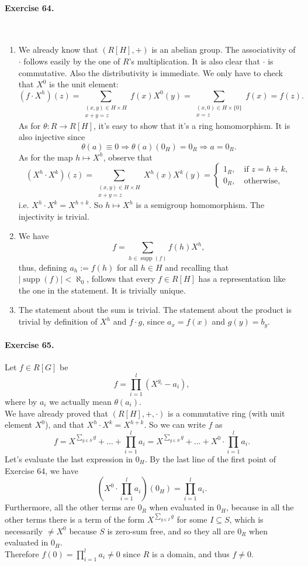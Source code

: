 \documentclass[12pt,a4paper]{report}
\theoremstyle{definition}
\theoremstyle{num.custom-title}
\DeclareMathOperator{\imp}{\Rightarrow}
\DeclareMathOperator{\sse}{\subseteq}
\DeclareMathOperator{\supp}{supp}
\begin{document}
\paragraph{Exercise 64.} \ 
\begin{enumerate}
\item We already know that $(R[H],+)$ is an abelian group. The associativity of $\cdot$ follows easily by the one of $R$'s multiplication. It is also clear that $\cdot$ is commutative. Also the distributivity is immediate. We only have to check that $X^0$ is the unit element:
\[
(f \cdot X^h)(z) = \sum_{\substack{(x,y) \in H \times H \\ x+y=z}} f(x) X^0(y) = \sum_{\substack{(x,0) \in H \times \{0\} \\ x=z}} f(x) = f(z).
\]
As for $\theta : R \to R[H]$, it's easy to show that it's a ring homomorphism. It is also injective since
\[
\theta(a) \equiv 0 \imp \theta(a)(0_H) = 0_R \imp a = 0_R.
\]
As for the map $h \mapsto X^h$, observe that
\[
(X^h \cdot X^k)(z) = \sum_{\substack{(x,y) \in H \times H \\ x+y=z}} X^h(x) X^k(y) =
\begin{cases}
1_R, \quad \text{if } z=h+k, \\
0_R, \quad \text{otherwise,}
\end{cases}
\]
i.e. $X^h \cdot X^k = X^{h+k}$. So $h \mapsto X^h$ is a semigroup homomorphism. The injectivity is trivial.
\item We have
\[
f = \sum_{h \in \supp(f)} f(h) X^h,
\]
thus, defining $a_h := f(h)$ for all $h \in H$ and recalling that $|\supp(f)| < \aleph_0$, follows that every $f \in R[H]$ has a representation like the one in the statement. It is trivially unique.
\item The statement about the sum is trivial. The statement about the product is trivial by definition of $X^h$ and $f \cdot g$, since $a_x = f(x)$ and $g(y) = b_y$.
\end{enumerate}

\paragraph{Exercise 65.} Let $f \in R[G]$ be
\[
f = \prod_{i=1}^l (X^{g_i} - a_i),
\]
where by $a_i$ we actually mean $\theta(a_i)$.\\
 We have already proved that $(R[H],+,\cdot)$ is a commutative ring (with unit element $X^0$), and that $X^h \cdot X^k = X^{h+k}$. So we can write $f$ as
\[
f= X^{\sum_{g \in S} g} + \ldots + \prod_{i=1}^l a_i = X^{\sum_{g \in S} g} + \ldots + X^0 \cdot \prod_{i=1}^l a_i.
\]
Let's evaluate the last expression in $0_H$. By the last line of the first point of Exercise 64, we have
\[
\left( X^0 \cdot \prod_{i=1}^l a_i \right) (0_H) = \prod_{i=1}^l a_i.
\]
Furthermore, all the other terms are $0_R$ when evaluated in $0_H$, because in all the other terms there is a term of the form $X^{\sum_{g \in I} g}$ for some $I \sse S$, which is necessarily $\neq X^0$ because $S$ is zero-sum free, and so they all are $0_R$ when evaluated in $0_H$.\\
Therefore $f(0)= \prod_{i=1}^l a_i \neq 0$ since $R$ is a domain, and thus $f \neq 0$.
\end{document}
